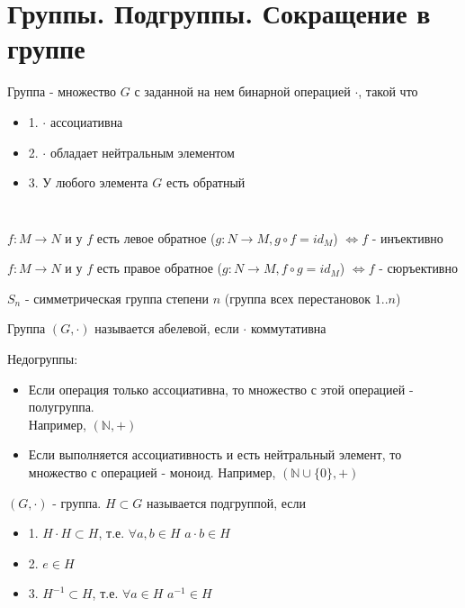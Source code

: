
\section{Группы. Подгруппы. Сокращение в группе}
\begin{conj}
    Группа - множество $G$ с заданной на нем бинарной операцией $\cdot$, такой что
    \begin{itemize}
    \item[] 1. $\cdot$ ассоциативна
    \item[] 2. $\cdot$ обладает нейтральным элементом
    \item[] 3. У любого элемента $G$ есть обратный
    \end{itemize}
\end{conj}

$ $\\
\begin{theorem-non} $ $

$f: M \to N$ и у $f$ есть левое обратное ($g: N \to M, g \circ f = id_M$) $\Leftrightarrow f$ - инъективно

$f: M \to N$ и у $f$ есть правое обратное ($g: N \to M, f\circ g = id_M$) $\Leftrightarrow f$ - сюръективно
\end{theorem-non}

\begin{conj}
    $S_n$ - симметрическая группа степени $n$ (группа всех перестановок $1..n$)
\end{conj}
\begin{conj}
    Группа $(G, \cdot)$ называется абелевой, если $\cdot$ коммутативна
\end{conj}
Недогруппы:
\begin{itemize}
    \item Если операция только ассоциативна, то множество с этой операцией - полугруппа.\\
    Например, $(\mathbb{N}, +)$
    \item Если выполняется ассоциативность и есть нейтральный элемент, то множество с операцией - моноид.
    Например, $(\mathbb{N} \cup \{0\}, +)$
\end{itemize}
\begin{conj}
    $(G, \cdot)$ - группа. $H \subset G$ называется подгруппой, если
    \begin{itemize}
    \item[] 1. $H\cdot H \subset H$, 
    т.е. $\forall a, b \in H \,\, a \cdot b \in H$
    \item[] 2. $e \in H$
    \item[] 3. $H^{-1} \subset H$,
    т.е. $\forall a \in H \,\, a^{-1} \in H$
    \end{itemize}
\end{conj}